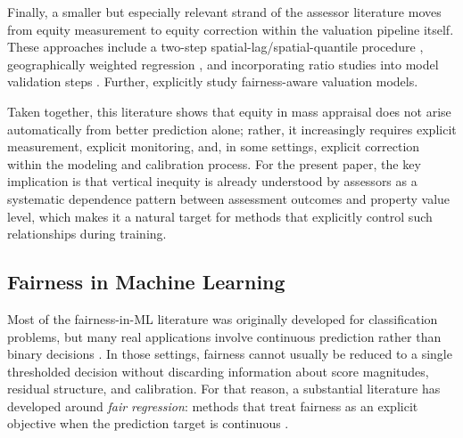 \documentclass[12pt, draft]{article}
\theoremstyle{plain}
\theoremstyle{definition}
\newcommand{\1}{\mathbf{1}}
\begin{document}
Finally, a smaller but especially relevant strand of the assessor literature moves from equity measurement to equity correction within the valuation pipeline itself. These approaches include a two-step spatial-lag/spatial-quantile procedure \cite{Quintos2014}, geographically weighted regression \cite{BidansetEtAl2019, BidansetEtAl2025}, and incorporating ratio studies into model validation steps \cite{HermansEtAl2022, HermansEtAl2025}. Further, \textcite{CandoganHanLu2023} explicitly study fairness-aware valuation models. 

Taken together, this literature shows that equity in mass appraisal does not arise automatically from better prediction alone; rather, it increasingly requires explicit measurement, explicit monitoring, and, in some settings, explicit correction within the modeling and calibration process. For the present paper, the key implication is that vertical inequity is already understood by assessors as a systematic dependence pattern between assessment outcomes and property value level, which makes it a natural target for methods that explicitly control such relationships during training.

\subsection{Fairness in Machine Learning}

Most of the fairness-in-ML literature was originally developed for classification problems, but many real applications involve continuous prediction rather than binary decisions \cite{CatonHaas2024,BarocasHardtNarayanan2023}. In those settings, fairness cannot usually be reduced to a single thresholded decision without discarding information about score magnitudes, residual structure, and calibration. For that reason, a substantial literature has developed around \emph{fair regression}: methods that treat fairness as an explicit objective when the prediction target is continuous \cite{AgarwalDudikWu2019,FitzsimonsEtAl2019,ChzhenEtAl2020Wasserstein,ChzhenEtAl2020Recalibration,WeiEtAl2023}.
\end{document}
